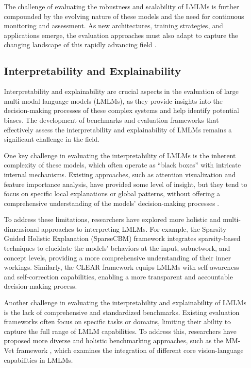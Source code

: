 \documentclass[11pt]{article}
\begin{document}
The challenge of evaluating the robustness and scalability of LMLMs is further compounded by the evolving nature of these models and the need for continuous monitoring and assessment. As new architectures, training strategies, and applications emerge, the evaluation approaches must also adapt to capture the changing landscape of this rapidly advancing field \cite{ref182}.

\subsection{Interpretability and Explainability}

Interpretability and explainability are crucial aspects in the evaluation of large multi-modal language models (LMLMs), as they provide insights into the decision-making processes of these complex systems and help identify potential biases. The development of benchmarks and evaluation frameworks that effectively assess the interpretability and explainability of LMLMs remains a significant challenge in the field.

One key challenge in evaluating the interpretability of LMLMs is the inherent complexity of these models, which often operate as ``black boxes'' with intricate internal mechanisms. Existing approaches, such as attention visualization and feature importance analysis, have provided some level of insight, but they tend to focus on specific local explanations or global patterns, without offering a comprehensive understanding of the models' decision-making processes \cite{ref29,ref183}.

To address these limitations, researchers have explored more holistic and multi-dimensional approaches to interpreting LMLMs. For example, the Sparsity-Guided Holistic Explanation (SparseCBM) framework \cite{ref183} integrates sparsity-based techniques to elucidate the models' behaviors at the input, subnetwork, and concept levels, providing a more comprehensive understanding of their inner workings. Similarly, the CLEAR framework \cite{ref184} equips LMLMs with self-awareness and self-correction capabilities, enabling a more transparent and accountable decision-making process.

Another challenge in evaluating the interpretability and explainability of LMLMs is the lack of comprehensive and standardized benchmarks. Existing evaluation frameworks often focus on specific tasks or domains, limiting their ability to capture the full range of LMLM capabilities. To address this, researchers have proposed more diverse and holistic benchmarking approaches, such as the MM-Vet framework \cite{ref185}, which examines the integration of different core vision-language capabilities in LMLMs.
\end{document}
